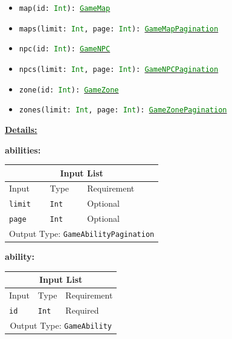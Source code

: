 \documentclass[10pt, a4paper]{memoir}
\numberwithin{equation}{section}
\theoremstyle{plain}
\theoremstyle{defp}
\theoremstyle{dotless}
\theoremstyle{definition}
\theoremstyle{dotless}
\theoremstyle{dotless}
\theoremstyle{defp}
\theoremstyle{defp}
\theoremstyle{be}          %
\theoremstyle{defp}
\newcommand\ttt[1]{\texttt{#1}}
\newcommand\type[1]{\ttt{\textcolor{green}{#1}}}
\begin{document}
\begin{itemize}[noitemsep,topsep=1pt]
\begin{itemize}[itemsep=1pt,topsep=1pt]
\item \ttt{map(id: \type{Int}): \hyperref[sec:GameMap]{\type{GameMap}}}
\item \ttt{maps(limit: \type{Int}, page: \type{Int}): \hyperref[sec:gamemappagination]{\type{GameMapPagination}}}
\item \ttt{npc(id: \type{Int}): \hyperref[sec:GameNPC]{\type{GameNPC}}}
\item \ttt{npcs(limit: \type{Int}, page: \type{Int}): \hyperref[sec:gamenpcpagination]{\type{GameNPCPagination}}}
\item \ttt{zone(id: \type{Int}): \hyperref[sec:GameZone]{\type{GameZone}}}
\item \ttt{zones(limit: \type{Int}, page: \type{Int}): \hyperref[sec:gamezonepagination]{\type{GameZonePagination}}}
\end{itemize}
\end{itemize}

\underline{\textbf{Details:}}

\textbf{abilities:}
\begin{table}[h!]
	\centering
	\begin{tabular}{ |p{4.2cm}|p{6cm}|p{3cm}|  }
		\hline
		\multicolumn{3}{|c|}{Input List} \\
		\hline
		Input & Type & Requirement\\
		\hline
		\ttt{limit} & \ttt{Int} & Optional\\
		\ttt{page} & \ttt{Int} & Optional\\
		\hline
		\multicolumn{3}{|c|}{Output Type: \ttt{GameAbilityPagination}} \\
		\hline
	\end{tabular}
\end{table}

\medskip

\textbf{ability:}

\begin{table}[h!]
	\centering
	\begin{tabular}{ |p{4.2cm}|p{6cm}|p{3cm}|  }
		\hline
		\multicolumn{3}{|c|}{Input List} \\
		\hline
		Input & Type & Requirement\\
		\hline
		\ttt{id} & \ttt{Int} & Required\\
		\hline
		\multicolumn{3}{|c|}{Output Type: \ttt{GameAbility}} \\
		\hline
	\end{tabular}
\end{table}

\newpage
\end{document}
